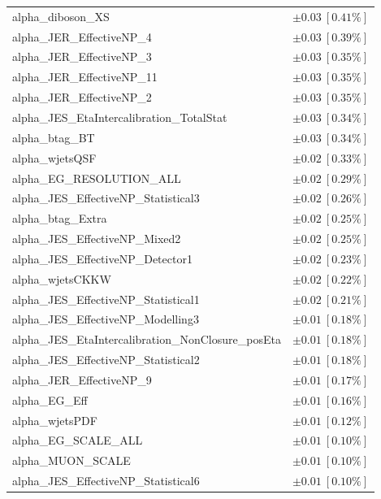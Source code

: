 \begin{table}
\begin{center}
\begin{tabular*}{\textwidth}{@{\extracolsep{\fill}}lc}
alpha\_diboson\_XS         & $\pm 0.03\ [0.41\%] $       \\
alpha\_JER\_EffectiveNP\_4         & $\pm 0.03\ [0.39\%] $       \\
alpha\_JER\_EffectiveNP\_3         & $\pm 0.03\ [0.35\%] $       \\
alpha\_JER\_EffectiveNP\_11         & $\pm 0.03\ [0.35\%] $       \\
alpha\_JER\_EffectiveNP\_2         & $\pm 0.03\ [0.35\%] $       \\
alpha\_JES\_EtaIntercalibration\_TotalStat         & $\pm 0.03\ [0.34\%] $       \\
alpha\_btag\_BT         & $\pm 0.03\ [0.34\%] $       \\
alpha\_wjetsQSF         & $\pm 0.02\ [0.33\%] $       \\
alpha\_EG\_RESOLUTION\_ALL         & $\pm 0.02\ [0.29\%] $       \\
alpha\_JES\_EffectiveNP\_Statistical3         & $\pm 0.02\ [0.26\%] $       \\
alpha\_btag\_Extra         & $\pm 0.02\ [0.25\%] $       \\
alpha\_JES\_EffectiveNP\_Mixed2         & $\pm 0.02\ [0.25\%] $       \\
alpha\_JES\_EffectiveNP\_Detector1         & $\pm 0.02\ [0.23\%] $       \\
alpha\_wjetsCKKW         & $\pm 0.02\ [0.22\%] $       \\
alpha\_JES\_EffectiveNP\_Statistical1         & $\pm 0.02\ [0.21\%] $       \\
alpha\_JES\_EffectiveNP\_Modelling3         & $\pm 0.01\ [0.18\%] $       \\
alpha\_JES\_EtaIntercalibration\_NonClosure\_posEta         & $\pm 0.01\ [0.18\%] $       \\
alpha\_JES\_EffectiveNP\_Statistical2         & $\pm 0.01\ [0.18\%] $       \\
alpha\_JER\_EffectiveNP\_9         & $\pm 0.01\ [0.17\%] $       \\
alpha\_EG\_Eff         & $\pm 0.01\ [0.16\%] $       \\
alpha\_wjetsPDF         & $\pm 0.01\ [0.12\%] $       \\
alpha\_EG\_SCALE\_ALL         & $\pm 0.01\ [0.10\%] $       \\
alpha\_MUON\_SCALE         & $\pm 0.01\ [0.10\%] $       \\
alpha\_JES\_EffectiveNP\_Statistical6         & $\pm 0.01\ [0.10\%] $       \\

\end{tabular*}
\end{center}
\end{table}
